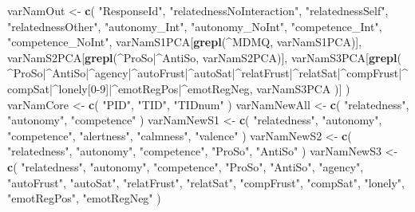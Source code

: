\documentclass[
]{article}
\newenvironment{Shaded}{\begin{snugshade}}{\end{snugshade}}
\newcommand{\FunctionTok}[1]{\textcolor[rgb]{0.13,0.29,0.53}{\textbf{#1}}}
\newcommand{\NormalTok}[1]{#1}
\newcommand{\OtherTok}[1]{\textcolor[rgb]{0.56,0.35,0.01}{#1}}
\newcommand{\StringTok}[1]{\textcolor[rgb]{0.31,0.60,0.02}{#1}}
\begin{document}
\begin{Shaded}
\begin{Highlighting}[]
\NormalTok{varNamOut }\OtherTok{\textless{}{-}} \FunctionTok{c}\NormalTok{(}
  \StringTok{"ResponseId"}\NormalTok{,}
  \StringTok{"relatednessNoInteraction"}\NormalTok{,}
  \StringTok{"relatednessSelf"}\NormalTok{,}
  \StringTok{"relatednessOther"}\NormalTok{,}
  \StringTok{"autonomy\_Int"}\NormalTok{,}
  \StringTok{"autonomy\_NoInt"}\NormalTok{,}
  \StringTok{"competence\_Int"}\NormalTok{,}
  \StringTok{"competence\_NoInt"}\NormalTok{,}
\NormalTok{  varNamS1PCA[}\FunctionTok{grepl}\NormalTok{(}\StringTok{\textquotesingle{}\^{}MDMQ\textquotesingle{}}\NormalTok{, varNamS1PCA)],}
\NormalTok{  varNamS2PCA[}\FunctionTok{grepl}\NormalTok{(}\StringTok{\textquotesingle{}\^{}ProSo|\^{}AntiSo\textquotesingle{}}\NormalTok{, varNamS2PCA)],}
\NormalTok{  varNamS3PCA[}\FunctionTok{grepl}\NormalTok{(}
    \StringTok{\textquotesingle{}\^{}ProSo|\^{}AntiSo|\^{}agency|\^{}autoFrust|\^{}autoSat|\^{}relatFrust|\^{}relatSat|\^{}compFrust|\^{}compSat|\^{}lonely[0{-}9]|\^{}emotRegPos|\^{}emotRegNeg\textquotesingle{}}\NormalTok{,}
\NormalTok{    varNamS3PCA}
\NormalTok{  )]}
\NormalTok{)}
\NormalTok{varNamCore }\OtherTok{\textless{}{-}} \FunctionTok{c}\NormalTok{(}
  \StringTok{"PID"}\NormalTok{,}
  \StringTok{"TID"}\NormalTok{,}
  \StringTok{"TIDnum"}
\NormalTok{)}
\NormalTok{varNamNewAll }\OtherTok{\textless{}{-}} \FunctionTok{c}\NormalTok{(}
  \StringTok{"relatedness"}\NormalTok{,}
  \StringTok{"autonomy"}\NormalTok{,}
  \StringTok{"competence"}
\NormalTok{)}
\NormalTok{varNamNewS1 }\OtherTok{\textless{}{-}} \FunctionTok{c}\NormalTok{(}
  \StringTok{"relatedness"}\NormalTok{,}
  \StringTok{"autonomy"}\NormalTok{,}
  \StringTok{"competence"}\NormalTok{,}
  \StringTok{"alertness"}\NormalTok{, }
  \StringTok{"calmness"}\NormalTok{, }
  \StringTok{"valence"}
\NormalTok{)}
\NormalTok{varNamNewS2 }\OtherTok{\textless{}{-}} \FunctionTok{c}\NormalTok{(}
  \StringTok{"relatedness"}\NormalTok{,}
  \StringTok{"autonomy"}\NormalTok{,}
  \StringTok{"competence"}\NormalTok{,}
  \StringTok{"ProSo"}\NormalTok{, }
  \StringTok{"AntiSo"}
\NormalTok{)}
\NormalTok{varNamNewS3 }\OtherTok{\textless{}{-}} \FunctionTok{c}\NormalTok{(}
  \StringTok{"relatedness"}\NormalTok{,}
  \StringTok{"autonomy"}\NormalTok{,}
  \StringTok{"competence"}\NormalTok{,}
  \StringTok{"ProSo"}\NormalTok{, }
  \StringTok{"AntiSo"}\NormalTok{,}
  \StringTok{"agency"}\NormalTok{,}
  \StringTok{"autoFrust"}\NormalTok{,}
  \StringTok{"autoSat"}\NormalTok{,}
  \StringTok{"relatFrust"}\NormalTok{,}
  \StringTok{"relatSat"}\NormalTok{,}
  \StringTok{"compFrust"}\NormalTok{,}
  \StringTok{"compSat"}\NormalTok{,}
  \StringTok{"lonely"}\NormalTok{,}
  \StringTok{"emotRegPos"}\NormalTok{,}
  \StringTok{"emotRegNeg"}
\NormalTok{)}


\end{Highlighting}
\end{Shaded}
\end{document}
